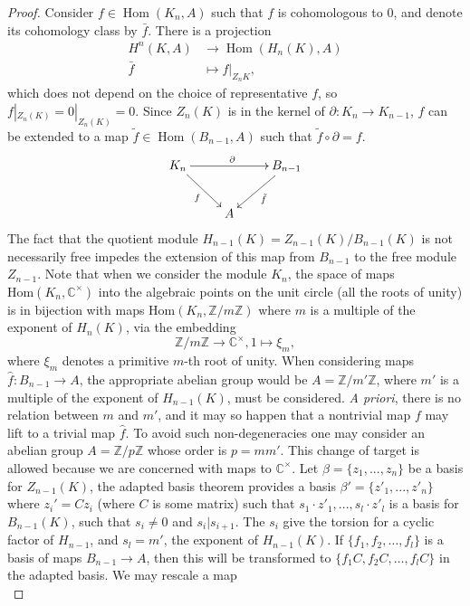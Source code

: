 \documentclass[11pt]{book}
\theoremstyle{Rem}
\theoremstyle{definition}
\numberwithin{equation}{section}
\newcommand\Hom{\operatorname{Hom}}
\newcommand\CC{\mathbb C}
\newcommand\ZZ{\mathbb Z}
\begin{document}
\begin{proof}

 Consider $f\in \Hom(K_n,A)$ such that $f$ is cohomologous to 0, and denote its cohomology class by $\bar{f}$. There is a projection \begin{align}
 	H^n(K,A) &\rightarrow \Hom(H_n(K), A)\\ \bar{f}&\mapsto f|_{Z_nK},
 \end{align} which does not depend on the choice of representative $f$, so $f|_{Z_n(K)}=0|_{Z_n(K)}=0$. Since $Z_n(K)$ is in the kernel of $\partial:K_n\rightarrow K_{n-1}$, $f$ can be extended to a map $\tilde{f}\in \Hom(B_{n-1}, A)$ such that $\tilde{f}\circ \partial =f$. 
\[
\begin{xymatrix}
{ K_n \ar[rd]_f \ar[rr]^\partial & & B_{n-1}\ar[ld]^{\tilde{f}} \\
& A }
\end{xymatrix}
\]
 The fact that the quotient module $H_{n-1}(K) = Z_{n-1}(K)/B_{n-1}(K)$ is not necessarily free impedes the extension of this map from $B_{n-1}$ to the free module $Z_{n-1}$. Note that when we consider the module $K_n$, the space of maps $\text{Hom}(K_n, \CC^\times)$ into the algebraic points on the unit circle (all the roots of unity) is in bijection with maps Hom$(K_n, \ZZ/m\ZZ)$ where $m$ is a multiple of the exponent of $H_n(K)$, via the embedding 
 \begin{equation}
 	\ZZ/m\ZZ \rightarrow \CC^\times, 1\mapsto \xi_m,
 \end{equation}
 where $\xi_m$ denotes a primitive $m$-th root of unity. When considering maps $\hat{f}:B_{n-1} \rightarrow A$, the appropriate abelian group would be $A=\ZZ/m'\ZZ$, where $m'$ is a multiple of the exponent of $H_{n-1}(K)$, must be considered. \textit{A priori}, there is no relation between $m$ and $m'$, and  it may so happen that a nontrivial map $f$ may lift to a trivial map $\hat{f}$. To avoid such non-degeneracies one may consider an abelian group $A=\ZZ/p\ZZ$ whose order is $p=mm'$. This change of target is allowed because we are concerned with maps to $\CC^\times$.
Let $\beta=\{z_1,..., z_n\}$ be a basis for $Z_{n-1}(K)$, the adapted basis theorem provides a basis $\beta' =\{z'_1,...,z'_n\}$ where $z_i' = Cz_i$ (where $C$ is some matrix) such that ${s_1\cdot z'_1,..., s_l\cdot z'_l}$ is a basis for $B_{n-1}(K)$, such that $s_i\neq 0$ and $s_i|s_{i+1}$. The $s_i$ give the torsion for a cyclic factor of $H_{n-1}$, and $s_l=m'$, the exponent of $H_{n-1}(K)$. If $\{f_1, f_2,\dots, f_l\}$ is a basis of maps $B_{n-1}\rightarrow A$, then this will be transformed to $ \{ f_1C, f_2C, \dots, f_lC\}$ in the adapted basis. We may rescale a map \begin{equation}

\end{equation}
\end{proof}
\end{document}
